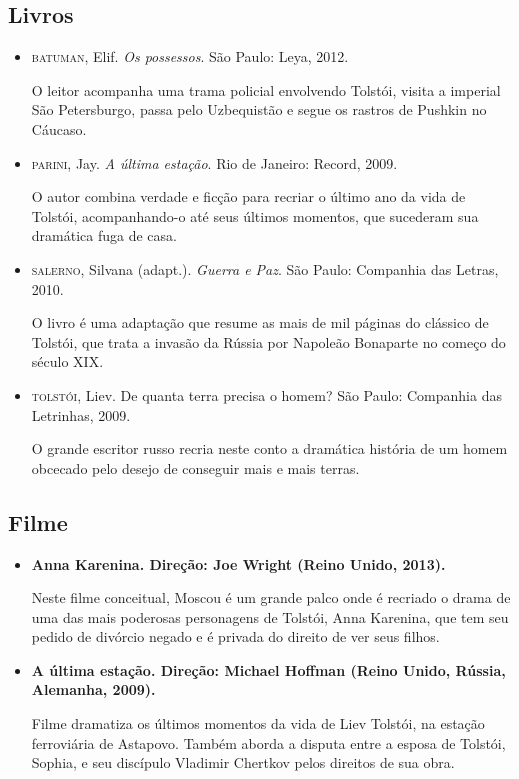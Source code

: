 \documentclass[12pt]{extarticle}
\begin{document}
\subsection{Livros}

\begin{itemize}
\item\textsc{batuman}, Elif. \textit{Os possessos}. São Paulo: Leya, 2012.

O leitor acompanha uma trama policial envolvendo Tolstói, visita a
imperial São Petersburgo, passa pelo Uzbequistão e segue os rastros de
Pushkin no Cáucaso.

\item\textsc{parini}, Jay. \textit{A última estação}. Rio de Janeiro: Record, 2009.

O autor combina verdade e ficção para recriar o último ano da vida de
Tolstói, acompanhando-o até seus últimos momentos, que sucederam sua
dramática fuga de casa.

\item\textsc{salerno}, Silvana (adapt.). \textit{Guerra e Paz}. São Paulo: Companhia
das Letras, 2010.

O livro é uma adaptação que resume as mais de mil páginas do clássico de
Tolstói, que trata a invasão da Rússia por Napoleão Bonaparte no começo
do século XIX.

\item\textsc{tolstói}, Liev. De quanta terra precisa o homem? São Paulo:
Companhia das Letrinhas, 2009.

O grande escritor russo recria neste conto a dramática história de um
homem obcecado pelo desejo de conseguir mais e mais terras.
\end{itemize}

\subsection{Filme}

\begin{itemize}
\item\textbf{Anna Karenina. Direção: Joe Wright (Reino Unido, 2013).}

Neste filme conceitual, Moscou é um grande palco onde é recriado o drama
de uma das mais poderosas personagens de Tolstói, Anna Karenina, que tem
seu pedido de divórcio negado e é privada do direito de ver seus filhos.

\item\textbf{A última estação. Direção: Michael Hoffman (Reino Unido, Rússia,
Alemanha, 2009).}

Filme dramatiza os últimos momentos da vida de Liev Tolstói, na estação
ferroviária de Astapovo. Também aborda a disputa entre a esposa de
Tolstói, Sophia, e seu discípulo Vladimir Chertkov pelos direitos de sua
obra.
\end{itemize}
\end{document}

